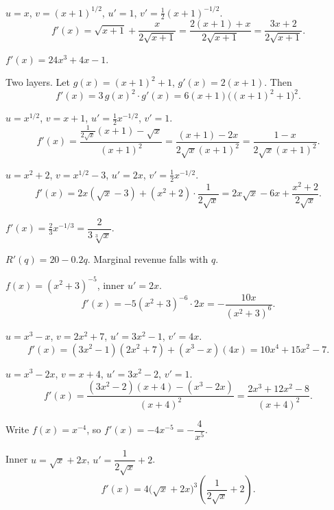 \begin{solutions}
  \item $u=x$, $v=(x+1)^{1/2}$, $u'=1$, $v'=\tfrac12(x+1)^{-1/2}$.
        \[
          f'(x)=\sqrt{x+1}+\frac{x}{2\sqrt{x+1}}
               =\frac{2(x+1)+x}{2\sqrt{x+1}}=\frac{3x+2}{2\sqrt{x+1}} .
        \]

  \item $f'(x)=24x^{3}+4x-1$.

  \item Two layers. Let $g(x)=(x+1)^{2}+1$, $g'(x)=2(x+1)$. Then
        \[
          f'(x)=3\,g(x)^{2}\cdot g'(x)=6(x+1)\bigl((x+1)^{2}+1\bigr)^{2} .
        \]

  \item $u=x^{1/2}$, $v=x+1$, $u'=\tfrac12x^{-1/2}$, $v'=1$.
        \[
          f'(x)=\frac{\frac{1}{2\sqrt{x}}(x+1)-\sqrt{x}}{(x+1)^{2}}
               =\frac{(x+1)-2x}{2\sqrt{x}(x+1)^{2}}
               =\frac{1-x}{2\sqrt{x}(x+1)^{2}} .
        \]

  \item $u=x^{2}+2$, $v=x^{1/2}-3$, $u'=2x$, $v'=\tfrac12x^{-1/2}$.
        \[
          f'(x)=2x(\sqrt{x}-3)+(x^{2}+2)\cdot\frac{1}{2\sqrt{x}}
               =2x\sqrt{x}-6x+\frac{x^{2}+2}{2\sqrt{x}} .
        \]

  \item $f'(x)=\tfrac23x^{-1/3}=\dfrac{2}{3\sqrt[3]{x}}$.

  \item $R'(q)=20-0.2q$. Marginal revenue falls with $q$.

  \item $f(x)=(x^{2}+3)^{-5}$, inner $u'=2x$.
        \[
          f'(x)=-5(x^{2}+3)^{-6}\cdot 2x=-\frac{10x}{(x^{2}+3)^{6}} .
        \]

  \item $u=x^{3}-x$, $v=2x^{2}+7$, $u'=3x^{2}-1$, $v'=4x$.
        \[
          f'(x)=(3x^{2}-1)(2x^{2}+7)+(x^{3}-x)(4x)=10x^{4}+15x^{2}-7 .
        \]

  \item $u=x^{3}-2x$, $v=x+4$, $u'=3x^{2}-2$, $v'=1$.
        \[
          f'(x)=\frac{(3x^{2}-2)(x+4)-(x^{3}-2x)}{(x+4)^{2}}
               =\frac{2x^{3}+12x^{2}-8}{(x+4)^{2}} .
        \]

  \item Write $f(x)=x^{-4}$, so $f'(x)=-4x^{-5}=-\dfrac{4}{x^{5}}$.

  \item Inner $u=\sqrt{x}+2x$, $u'=\dfrac{1}{2\sqrt{x}}+2$.
        \[
          f'(x)=4\bigl(\sqrt{x}+2x\bigr)^{3}\left(\frac{1}{2\sqrt{x}}+2\right) .
        \]


\end{solutions}
